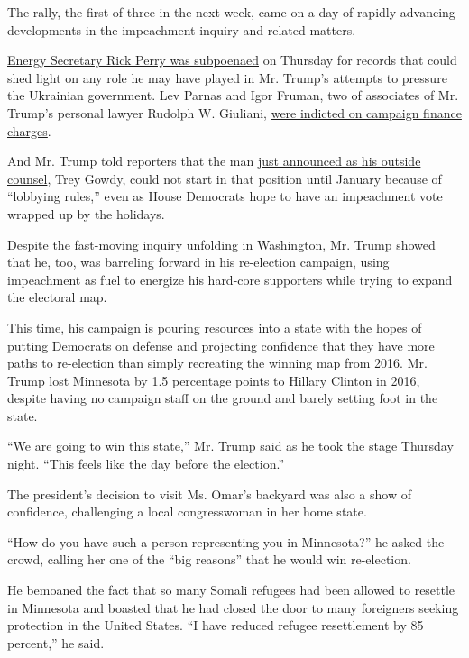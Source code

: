 The rally, the first of three in the next week, came on a day of rapidly
advancing developments in the impeachment inquiry and related matters.

\href{https://www.nytimes.com/2019/10/10/us/politics/rick-perry-subpoena.html?action=click\&module=Top\%20Stories\&pgtype=Homepage}{Energy
Secretary Rick Perry was subpoenaed} on Thursday for records that could
shed light on any role he may have played in Mr. Trump's attempts to
pressure the Ukrainian government. Lev Parnas and Igor Fruman, two of
associates of Mr. Trump's personal lawyer Rudolph W. Giuliani,
\href{https://www.nytimes.com/2019/10/10/us/politics/lev-parnas-igor-fruman-arrested-giuliani.html?module=inline}{were
indicted on campaign finance charges}.

And Mr. Trump told reporters that the man
\href{https://www.nytimes.com/2019/10/09/us/politics/trey-gowdy-trump-legal-team.html}{just
announced as his outside counsel}, Trey Gowdy, could not start in that
position until January because of ``lobbying rules,'' even as House
Democrats hope to have an impeachment vote wrapped up by the holidays.

Despite the fast-moving inquiry unfolding in Washington, Mr. Trump
showed that he, too, was barreling forward in his re-election campaign,
using impeachment as fuel to energize his hard-core supporters while
trying to expand the electoral map.

This time, his campaign is pouring resources into a state with the hopes
of putting Democrats on defense and projecting confidence that they have
more paths to re-election than simply recreating the winning map from
2016. Mr. Trump lost Minnesota by 1.5 percentage points to Hillary
Clinton in 2016, despite having no campaign staff on the ground and
barely setting foot in the state.

``We are going to win this state,'' Mr. Trump said as he took the stage
Thursday night. ``This feels like the day before the election.''

The president's decision to visit Ms. Omar's backyard was also a show of
confidence, challenging a local congresswoman in her home state.

``How do you have such a person representing you in Minnesota?'' he
asked the crowd, calling her one of the ``big reasons'' that he would
win re-election.

He bemoaned the fact that so many Somali refugees had been allowed to
resettle in Minnesota and boasted that he had closed the door to many
foreigners seeking protection in the United States. ``I have reduced
refugee resettlement by 85 percent,'' he said.

